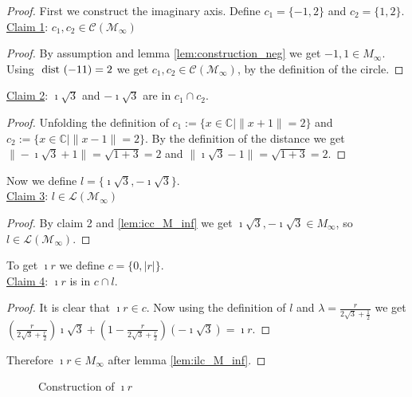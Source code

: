 \begin{proof}
    \leanok
    First we construct the imaginary axis. Define $c_1 = \{-1,2\}$ and $c_2 = \{1,2\}$.\\
    \underline{Claim 1}: $c_1, c_2 \in \mathcal{C(M_{\infty})}$
    \begin{proof}
        By assumption and lemma \ref{lem:construction_neg} we get $-1, 1 \in M_{\infty}$. Using $\text{ dist }(-1 1)=2$ we get $c_1, c_2 \in \mathcal{C(M_{\infty})}$, by the definition of the circle.
    \end{proof}
    \underline{Claim 2}: $\imath\sqrt{3}$ and $-\imath\sqrt{3}$ are in $c_1 \cap c_2$.
    \begin{proof}
        Unfolding the definition of $c_1:=\{x\in\mathbb{C} \mid\|x+1\|=2\}$ and $c_2:=\{x\in\mathbb{C} \mid\|x-1\|=2\}$.
        By the definition of the distance we get $\|-\imath\sqrt{3}+1\| = \sqrt{1 + 3} = 2$ and $\|\imath\sqrt{3}-1\| = \sqrt{1 + 3} = 2$.
    \end{proof}
    Now we define $l = \{\imath\sqrt{3}, -\imath\sqrt{3}\}$.\\
    \underline{Claim 3}: $l \in \mathcal{L(M_{\infty})}$
    \begin{proof}
        By claim 2 and \ref{lem:icc_M_inf} we get $\imath\sqrt{3}, -\imath\sqrt{3} \in M_{\infty}$, so $l \in \mathcal{L(M_{\infty})}$.
    \end{proof}
    To get $\imath r$ we define $c = \{0,|r|\}$.\\
    \underline{Claim 4}: $\imath r$ is in $c \cap l$.
    \begin{proof}
        It is clear that $\imath r \in c$. Now using the definition of $l$ and $\lambda = \frac{r}{2\sqrt{3}+\frac{1}{2}}$ we get $(\frac{r}{2\sqrt{3}+\frac{r}{2}})\imath\sqrt{3} + (1-\frac{r}{2\sqrt{3}+\frac{r}{2}})(-\imath\sqrt{3}) = \imath r$. 
    \end{proof}
    Therefore $\imath r \in M_{\infty}$ after lemma \ref{lem:ilc_M_inf}.
\end{proof}
\begin{figure}[h]
    \centering
    \caption{Construction of $\imath r$}
    \label{Fig.4}
\end{figure}

